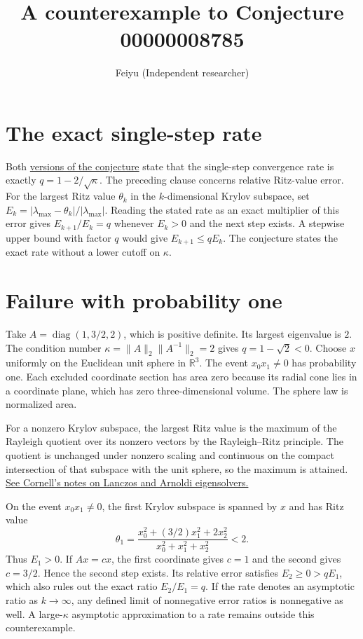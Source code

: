 \documentclass[11pt]{article}
\title{A counterexample to Conjecture 00000008785}
\author{Feiyu (Independent researcher)}
\date{}
\begin{document}
\maketitle

\section*{The exact single-step rate}
Both \href{https://github.com/The-Last-Math-Competition/The-Last-Math-Competition/blob/main/conjectures/00000008785.md}{versions of the conjecture}
state that the single-step convergence rate is exactly \(q=1-2/\sqrt{\kappa}\).
The preceding clause concerns relative Ritz-value error. For the largest Ritz
value \(\theta_k\) in the \(k\)-dimensional Krylov subspace, set
\(E_k=|\lambda_{\max}-\theta_k|/|\lambda_{\max}|\).
Reading the stated rate as an exact multiplier of this error gives
\(E_{k+1}/E_k=q\) whenever \(E_k>0\) and the next step exists.
A stepwise upper bound with factor \(q\) would give \(E_{k+1}\le qE_k\).
The conjecture states the exact rate without a lower cutoff on \(\kappa\).

\section*{Failure with probability one}
Take \(A=\operatorname{diag}(1,3/2,2)\), which is positive definite.
Its largest eigenvalue is \(2\). The condition number
\(\kappa=\|A\|_2\|A^{-1}\|_2=2\) gives \(q=1-\sqrt{2}<0\).
Choose \(x\) uniformly on the Euclidean unit sphere in \(\mathbb R^3\).
The event \(x_0 x_1\ne 0\) has probability one. Each excluded coordinate
section has area zero because its radial cone lies in a coordinate plane,
which has zero three-dimensional volume. The sphere law is normalized area.

For a nonzero Krylov subspace, the largest Ritz value is the maximum of
the Rayleigh quotient over its nonzero vectors by the Rayleigh--Ritz
principle. The quotient is unchanged under nonzero scaling and continuous
on the compact intersection of that subspace with the unit sphere, so the
maximum is attained.
\href{https://www.cs.cornell.edu/courses/cs6210/2025fa/lec/2025-12-01.html}{See Cornell's notes on Lanczos and Arnoldi eigensolvers.}

On the event \(x_0 x_1\ne 0\), the first Krylov subspace is spanned by \(x\)
and has Ritz value
\[
 \theta_1=\frac{x_0^2+(3/2)x_1^2+2x_2^2}{x_0^2+x_1^2+x_2^2}<2.
\]
Thus \(E_1>0\). If \(Ax=cx\), the first coordinate gives \(c=1\) and the
second gives \(c=3/2\). Hence the second step exists. Its relative error
satisfies \(E_2\ge 0>qE_1\), which also rules out the exact ratio \(E_2/E_1=q\).
If the rate denotes an asymptotic ratio as \(k\to\infty\), any defined limit
of nonnegative error ratios is nonnegative as well. A large-\(\kappa\)
asymptotic approximation to a rate remains outside this counterexample.
\end{document}
